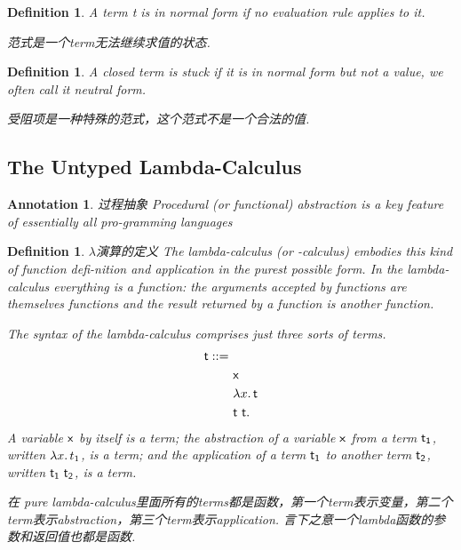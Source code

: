\documentclass{article}
\theoremstyle{plain}
\newtheorem{definition}[theorem]{Definition}
\newtheorem{annotation}[theorem]{Annotation}
\theoremstyle{nonumberplain}
\newcommand{\lam}[2]{\ensuremath{\lambda #1\ldotp #2}} %
\newcommand{\bnfdef}[0]{\ensuremath{\mathrel{::=}}} %
\newcommand{\term}[1]{\ensuremath\mathsf{#1}}
\begin{document}
\begin{definition}
\rm A term t is in normal form if no evaluation rule applies to it.

{\color{blue} 范式是一个term无法继续求值的状态}.
\end{definition}

\begin{definition}
\rm A closed term is stuck if it is in normal form but not a value, we often call it neutral form.

{\color{blue} 受阻项是一种特殊的范式，这个范式不是一个合法的值}.
\end{definition}



\newpage
\subsection{The Untyped Lambda-Calculus}

\begin{annotation}
\rm {\color{red} 过程抽象} Procedural (or functional) abstraction is a key feature of essentially all pro-gramming languages
\end{annotation}

\begin{definition}
\rm {\color{red} $\lambda$演算的定义} The lambda-calculus (or -calculus) embodies this kind of function defi-nition and application in the purest possible form. In the lambda-calculus everything is a function: the arguments accepted by functions are themselves functions and the result returned by a function is another function.

The syntax of the lambda-calculus comprises just three sorts of terms.
$$
\begin{aligned}
\term{t} \bnfdef & \\
&\ \term{x} \\
&\ \lam{x}{\term{t}} \\
&\ \term{t}\ \term{t}.
\end{aligned}
$$
A variable $\term{x}$ by itself is a term; the abstraction of a variable $\term{x}$ from a term $\term{t_1}$, written $\lam{x}{t_1}$, is a term; and the application of a term $\term{t_1}$ to another term $\term{t_2}$, written $\term{t_1}\ \term{t_2}$, is a term.

{\color{blue} 在 pure lambda-calculus里面所有的terms都是函数，第一个term表示变量，第二个term表示abstraction，第三个term表示application. 言下之意一个lambda函数的参数和返回值也都是函数}. 
\end{definition}
\end{document}
